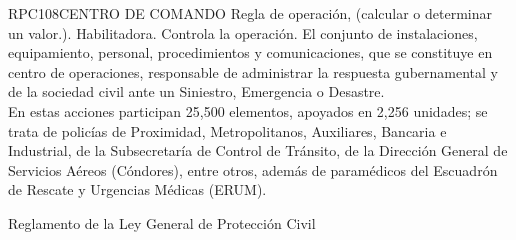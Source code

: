 \begin{BusinessRule}{RPC108}{CENTRO DE COMANDO}{
		Regla de operación, (calcular o determinar un valor.).
	}{
		Habilitadora. 
	}{
		Controla la operación. %
	}
	\BRItem[Descripción:] El conjunto de instalaciones, equipamiento, personal, procedimientos y comunicaciones, que se constituye en centro de operaciones, responsable de administrar la respuesta gubernamental y de la sociedad civil ante un Siniestro, Emergencia o Desastre.\\En estas acciones participan 25,500 elementos, apoyados en 2,256 unidades; se trata de policías de Proximidad, Metropolitanos, Auxiliares, Bancaria e Industrial, de la Subsecretaría de Control de Tránsito, de la Dirección General de Servicios Aéreos (Cóndores), entre otros, además de paramédicos del Escuadrón de Rescate y Urgencias Médicas (ERUM).
	
	
	 Reglamento de la Ley General de Protección Civil
\end{BusinessRule}